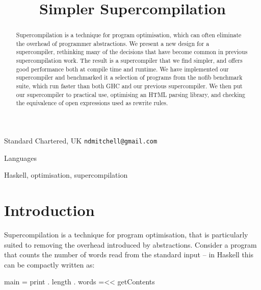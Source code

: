 \documentclass{sigplanconf}
\begin{document}

\titlebanner{\today{} - \currenttime{}}        %
\preprintfooter{}   %

\title{Simpler Supercompilation}

           {Standard Chartered, UK}
           {\verb"ndmitchell@gmail.com"}

\maketitle

\begin{abstract}
Supercompilation is a technique for program optimisation, which can often eliminate the overhead of programmer abstractions. We present a new design for a supercompiler, rethinking many of the decisions that have become common in previous supercompilation work. The result is a supercompiler that we find simpler, and offers good performance both at compile time and runtime. We have implemented our supercompiler and benchmarked it a selection of programs from the nofib benchmark suite, which run faster than both GHC and our previous supercompiler. We then put our supercompiler to practical use, optimising an HTML parsing library, and checking the equivalence of open expressions used as rewrite rules.
\end{abstract}


\terms
Languages

\keywords
Haskell, optimisation, supercompilation

\section{Introduction}


Supercompilation is a technique for program optimisation, that is particularly suited to removing the overhead introduced by abstractions. Consider a program that counts the number of words read from the standard input -- in Haskell \cite{haskell} this can be compactly written as:

\begin{code}
main = print . length . words =<< getContents
\end{code}
\end{document}
